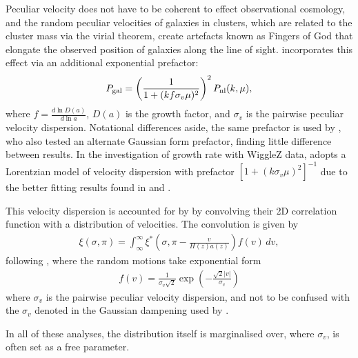 \documentclass[titlesmallcaps, examinerscopy, copyrightpage]{uqthesis}
\newcommand\abs[1]{\left|#1\right|}
\newcommand{\red}{\color{red}}
\begin{document}
Peculiar velocity does not have to be coherent to effect observational cosmology, and the random peculiar velocities of galaxies in clusters, which are related to the cluster mass via the virial theorem, create artefacts known as Fingers of God that elongate the observed position of galaxies along the line of sight. \citet{SanchezKazinBeutler2013} incorporates this effect via an additional exponential prefactor:
\begin{align}
P_{\rm{gal}} = \left( \frac{1}{1 + (k f \sigma_v \mu )^2} \right)^2  P_{\rm{nl}}(k, \mu),
\end{align}
where $f = \frac{d \ln D(a)}{d \ln a}$, $D(a)$ is the growth factor, and $\sigma_v$ is the pairwise peculiar velocity dispersion. Notational differences aside, the same prefactor is used by \citet{XuPadmanabhan2012}, who also tested an alternate Gaussian form prefactor, finding little difference between results. In the investigation of growth rate with WiggleZ data, \citet{BlakeBroughColless2011} adopts a Lorentzian model of velocity dispersion with prefactor $[1 + (k \sigma_v \mu)^2]^{-1}$ due to the better fitting results found in \citet{HawkinsMaddoxCole2003} and \citet{CabreGaztanaga2009}.

This velocity dispersion is accounted for by \citet{ChuangWang2012} by convolving their 2D correlation function with a distribution of velocities. The convolution is given by
\begin{align}
\xi(\sigma, \pi) = \int_\infty^\infty \xi^* \left(\sigma, \pi - \frac{v}{H(z) a(z)} \right) f(v)\, dv,
\end{align} 
following \citet{Peebles1980}, where the random motions take exponential form \citep{RatcliffeShanks1998,Landy2002}
\begin{align}
f(v) = \frac{1}{\sigma_v \sqrt{2}} \exp\left(- \frac{\sqrt{2}\abs{v}}{\sigma_v} \right)
\end{align}
where $\sigma_v$ is the pairwise peculiar velocity dispersion, and not to be confused with the $\sigma_v$ denoted in the Gaussian dampening used by \citet{BlakeDavis2011}.

In all of these analyses, the distribution itself is marginalised over, where $\sigma_v$, is often set as a free parameter.

\end{document}
